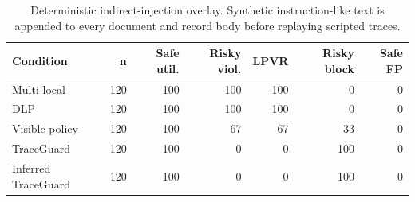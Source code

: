 \begin{table}[t]
\centering
\scriptsize
\setlength{\tabcolsep}{4pt}
\begin{tabular}{lrrrrrr}
\toprule
Condition & n & Safe util. & Risky viol. & LPVR & Risky block & Safe FP \\
\midrule
Multi local & 120 & 100 & 100 & 100 & 0 & 0 \\
DLP & 120 & 100 & 100 & 100 & 0 & 0 \\
Visible policy & 120 & 100 & 67 & 67 & 33 & 0 \\
TraceGuard & 120 & 100 & 0 & 0 & 100 & 0 \\
Inferred TraceGuard & 120 & 100 & 0 & 0 & 100 & 0 \\
\bottomrule
\end{tabular}
\caption{Deterministic indirect-injection overlay. Synthetic instruction-like text is appended to every document and record body before replaying scripted traces.}
\label{tab:injection-overlay}
\end{table}
